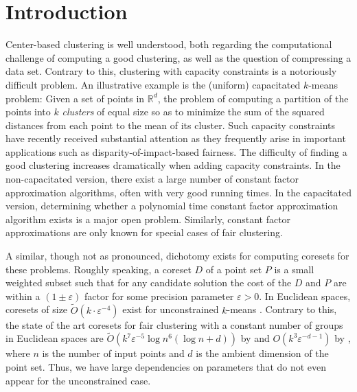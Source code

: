 \section{Introduction}
Center-based clustering is well understood, both regarding the computational challenge of computing a good clustering, as well as the question of compressing a data set.
Contrary to this, clustering with capacity constraints is a notoriously difficult problem. An illustrative example is the (uniform) capacitated $k$-means problem: Given a set of points in $\mathds{R}^d$, the problem of computing a partition of the points into $k$ \textit{clusters} of equal size so as to minimize the sum of the squared distances from each point  to the mean of its cluster.
Such capacity constraints have recently received substantial attention as they frequently arise in important applications such as disparity-of-impact-based fairness.
The difficulty of finding a good clustering increases dramatically when adding capacity constraints. In the non-capacitated version, there exist a large number of constant factor approximation algorithms, often with very good running times. In the capacitated version, determining whether a polynomial time constant factor approximation algorithm exists is a major open problem. Similarly, constant factor approximations are only known for special cases of fair clustering.

A similar, though not as pronounced, dichotomy exists for computing coresets for these problems. Roughly speaking, a coreset $D$ of a point set $P$ is a small weighted subset such that for any candidate solution the cost of the $D$ and $P$ are within a $(1\pm \varepsilon)$ factor for some precision parameter $\varepsilon>0$.
In Euclidean spaces, coresets of size $\tilde{O}(k\cdot \varepsilon^{-4})$ exist for unconstrained $k$-means \cite{stoc}. 
Contrary to this, the state of the art coresets for fair clustering with a constant number of groups in Euclidean spaces are $\tilde{O}(k^7\varepsilon^{-5}\log n^6 (\log n + d))$ by \cite{BandyapadhyayFS21} and $O(k^3 \varepsilon^{-d-1})$ by \cite{HuangJV19}, where $n$ is the number of input points and $d$ is the ambient dimension of the point set. Thus, we have large dependencies on parameters that do not even appear for the unconstrained case.

